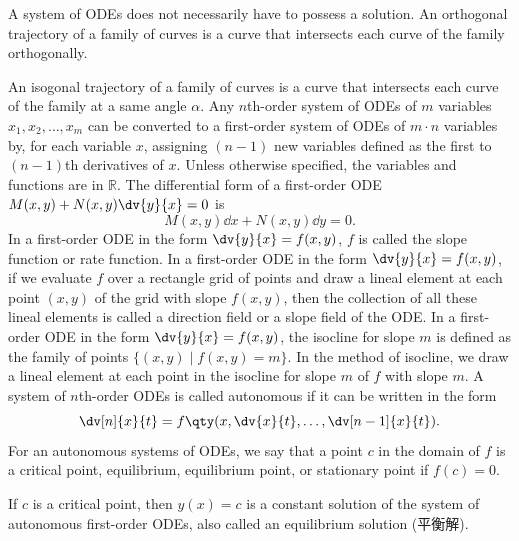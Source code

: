 \documentclass[a4paper,12pt]{report}
\begin{document}
A system of ODEs does not necessarily have to possess a solution.
An orthogonal trajectory of a family of curves is a curve that intersects each curve of the family orthogonally.

An isogonal trajectory of a family of curves is a curve that intersects each curve of the family at a same angle $\alpha$.
Any $n$th-order system of ODEs of $m$ variables $x_1,x_2,\ldots,x_m$ can be converted to a first-order system of ODEs of $m\cdot n$ variables by, for each variable $x$, assigning $(n-1)$ new variables defined as the first to $(n-1)$th derivatives of $x$.
Unless otherwise specified, the variables and functions are in $\mathbb{R}$.
The differential form of a first-order ODE $M(x,y)+N(x,y)\dv{y}{x}=0$ is
\[M(x,y)\dd{x}+N(x,y)\dd{y}=0.\]
In a first-order ODE in the form $\dv{y}{x}=f(x,y)$, $f$ is called the slope function or rate function.
In a first-order ODE in the form $\dv{y}{x}=f(x,y)$, if we evaluate $f$ over a rectangle grid of points and draw a lineal element at each point $(x,y)$ of the grid with slope $f(x,y)$, then the collection of all these lineal elements is called a direction field or a slope field of the ODE.
In a first-order ODE in the form $\dv{y}{x}=f(x,y)$, the isocline for slope $m$ is defined as the family of points $\{(x,y)\mid f(x,y)=m\}$. In the method of isocline, we draw a lineal element at each point in the isocline for slope $m$ of $f$ with slope $m$.
A system of $n$th-order ODEs is called autonomous if it can be written in the form
\[\dv[n]{x}{t}=f\qty(x,\dv{x}{t},\ldots,\dv[n-1]{x}{t}).\]
For an autonomous systems of ODEs, we say that a point $c$ in the domain of $f$ is a critical point, equilibrium, equilibrium point, or stationary point if $f(c)=0$.

If $c$ is a critical point, then $y(x)=c$ is a constant solution of the system of autonomous first-order ODEs, also called an equilibrium solution (平衡解).
\end{document}
